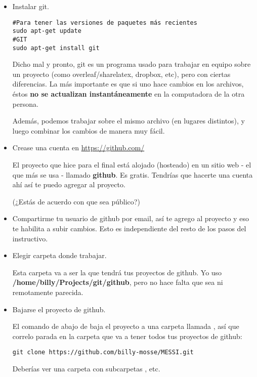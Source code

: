 \documentclass[10pt,a4paper]{report}
\begin{document}
\begin{itemize}

	\item Instalar git. 
\begin{lstlisting}
#Para tener las versiones de paquetes más recientes
sudo apt-get update
#GIT
sudo apt-get install git
\end{lstlisting}

Dicho mal y pronto, git es un programa usado para trabajar en equipo sobre un proyecto (como overleaf/sharelatex, dropbox, etc), pero con ciertas diferencias. La más importante es que si uno hace cambios en los archivos, éstos \textbf{no se actualizan instantáneamente} en la computadora de la otra persona.

Además, podemos trabajar sobre el mismo archivo (en lugares distintos), y luego combinar los cambios de manera muy fácil.

\item Crease una cuenta en \url{https://github.com/}

El proyecto que hice para el final está alojado (hosteado) en un sitio web - el que más se usa - llamado \textbf{github}. Es gratis. Tendrías que hacerte una cuenta ahí así te puedo agregar al proyecto.

(¿Estás de acuerdo con que sea público?)

\item Compartirme tu usuario de github por email, así te agrego al proyecto y eso te habilita a subir cambios. Esto es independiente del resto de los pasos del instructivo.

\item Elegir carpeta donde trabajar.

Esta carpeta va a ser la que tendrá tus proyectos de github. Yo uso \textbf{/home/billy/Projects/git/github}, pero no hace falta que sea ni remotamente parecida.

\item Bajarse el proyecto de github.

El comando de abajo de baja el proyecto a una carpeta llamada , así que correlo parada en la carpeta que va a tener todos tus proyectos de github:

\begin{lstlisting}
git clone https://github.com/billy-mosse/MESSI.git
\end{lstlisting}

Deberías ver una carpeta  con subcarpetas , etc.


\end{itemize}
\end{document}
